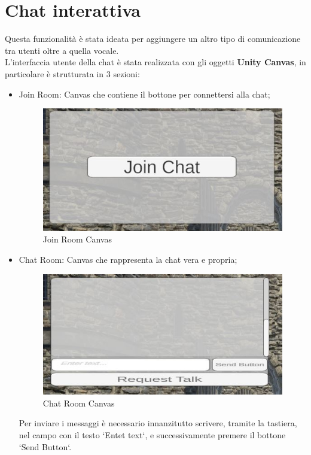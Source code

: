 \section{Chat interattiva}
Questa funzionalità è stata ideata per aggiungere un altro tipo di comunicazione tra utenti oltre a quella vocale.
\\L'interfaccia utente della chat è stata realizzata con gli oggetti \textbf{Unity Canvas}, in particolare è strutturata in 3 sezioni:
\begin{itemize}
    \item Join Room: Canvas che contiene il bottone per connettersi alla chat;
    \begin{figure}[H]
    \centering
    \includegraphics[scale = 0.65]{Immagini/ChatBackground.jpg}
    \caption{Join Room Canvas}
    \label{fig:my_label}
    \end{figure}
    \newpage\item Chat Room: Canvas che rappresenta la chat vera e propria;
        \begin{figure}[H]
    \centering
    \includegraphics[scale = 1]{Immagini/ChatRoom.jpg}
    \caption{Chat Room Canvas}
    \label{fig:my_label}
\end{figure}
    Per inviare i messaggi è necessario innanzitutto scrivere, tramite la tastiera, nel campo con il testo `Entet text`, e successivamente premere il bottone `Send Button`.

\end{itemize}
